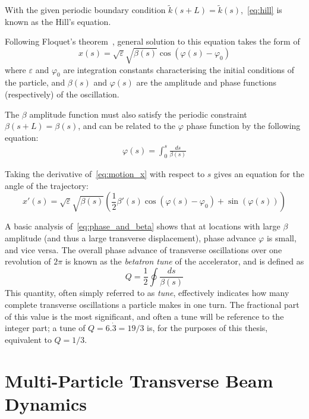 \documentclass[11pt]{report}
\begin{document}
With the given periodic boundary condition $\tilde k(s+L)=\tilde{k}(s)$,~\ref{eq:hill} is known as the Hill's equation. 

Following Floquet's theorem~\cite{Rossbach:247501}, general solution to this equation takes the form of
\begin{equation}
x(s) =\sqrt{\varepsilon}\sqrt{\beta(s)}\cos(\varphi(s)-\varphi_0)
\label{eq:motion_x}
\end{equation} where $\varepsilon$ and $\varphi_0$ are integration constants characterising the initial conditions of the particle, and $\beta(s)$ and $\varphi(s)$ are the amplitude and phase functions (respectively) of the oscillation.

The $\beta$ amplitude function must also satisfy the periodic constraint $\beta(s+L)=\beta(s)$, and can be related to the $\varphi$ phase function by the following equation:
\begin{eqnarray}
  \varphi(s) = \int^s_0\frac{ds}{\beta(s)}
  \label{eq:phase_and_beta}
\end{eqnarray}


Taking the derivative of~\eqref{eq:motion_x} with respect to $s$ gives an equation for the angle of the trajectory:
\begin{equation}
x'(s)=\sqrt{\varepsilon}\sqrt{\beta(s)}\left(\frac12\beta'(s)\cos(\varphi(s)-\varphi_0)+\sin(\varphi(s))\right)
\label{eq:motion_px}
\end{equation}

A basic analysis of~\eqref{eq:phase_and_beta} shows that at locations with large $\beta$ amplitude (and thus a large transverse displacement), phase advance $\varphi$ is small, and vice versa. The overall phase advance of transverse oscillations over one revolution of $2\pi$ is known as the \textit{betatron tune} of the accelerator, and is defined as
\begin{equation}
  Q=\frac12\oint\frac{ds}{\beta(s)}
  \label{eq:betatron_tune}
\end{equation}
This quantity, often simply referred to as \textit{tune}, effectively indicates how many complete transverse oscillations a particle makes in one turn. The fractional part of this value is the most significant, and often a tune will be reference to the integer part; a tune of $Q=6.\dot 3=19/3$ is, for the purposes of this thesis, equivalent to $Q=1/3$.
\clearpage

\section{Multi-Particle Transverse Beam Dynamics}\label{sec:theory-transverse}
\end{document}
